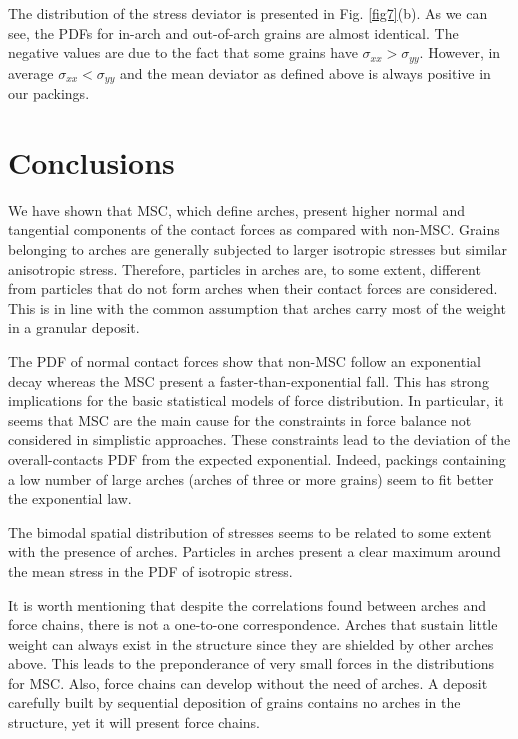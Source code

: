 The distribution of the stress deviator is presented in Fig. \ref{fig7}(b). As we can see, the PDFs for in-arch and out-of-arch grains are almost identical. The negative values are due to the fact that some grains have $\sigma_{xx} > \sigma_{yy}$. However, in average $\sigma_{xx} < \sigma_{yy}$ and the mean deviator as defined above is always positive in our packings.


\section{Conclusions}

We have shown that MSC, which define arches, present higher normal and tangential components of the contact forces as compared with non-MSC. Grains belonging to arches are generally subjected to larger isotropic stresses but similar anisotropic stress. Therefore, particles in arches are, to some extent, different from particles that do not form arches when their contact forces are considered. This is in line with the common assumption that arches carry most of the weight in a granular deposit. 

The PDF of normal contact forces show that non-MSC follow an exponential decay whereas the MSC present a faster-than-exponential fall. This has strong implications for the basic statistical models of force distribution. In particular, it seems that MSC are the main cause for the constraints in force balance not considered in simplistic approaches. These constraints lead to the deviation of the overall-contacts PDF from the expected exponential. Indeed, packings containing a low number of large arches (arches of three or more grains) seem to fit better the exponential law.

The bimodal spatial distribution of stresses seems to be related to some extent with the presence of arches. Particles in arches present a clear maximum around the mean stress in the PDF of isotropic stress. 

It is worth mentioning that despite the correlations found between arches and force chains, there is not a one-to-one correspondence. Arches that sustain little weight can always exist in the structure since they are shielded by other arches above. This leads to the preponderance of very small forces in the distributions for MSC. Also, force chains can develop without the need of arches. A deposit carefully built by sequential deposition of grains contains no arches in the structure, yet it will present force chains.

